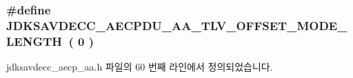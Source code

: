 \subsubsection[{\texorpdfstring{J\+D\+K\+S\+A\+V\+D\+E\+C\+C\+\_\+\+A\+E\+C\+P\+D\+U\+\_\+\+A\+A\+\_\+\+T\+L\+V\+\_\+\+O\+F\+F\+S\+E\+T\+\_\+\+M\+O\+D\+E\+\_\+\+L\+E\+N\+G\+TH}{JDKSAVDECC_AECPDU_AA_TLV_OFFSET_MODE_LENGTH}}]{\setlength{\rightskip}{0pt plus 5cm}\#define J\+D\+K\+S\+A\+V\+D\+E\+C\+C\+\_\+\+A\+E\+C\+P\+D\+U\+\_\+\+A\+A\+\_\+\+T\+L\+V\+\_\+\+O\+F\+F\+S\+E\+T\+\_\+\+M\+O\+D\+E\+\_\+\+L\+E\+N\+G\+TH~( 0 )}\hypertarget{group___a_e_c_p___a_a__tlv_ga7670a633c9cea7112916b80201d0f531}{}\label{group___a_e_c_p___a_a__tlv_ga7670a633c9cea7112916b80201d0f531}


jdksavdecc\+\_\+aecp\+\_\+aa.\+h 파일의 60 번째 라인에서 정의되었습니다.

